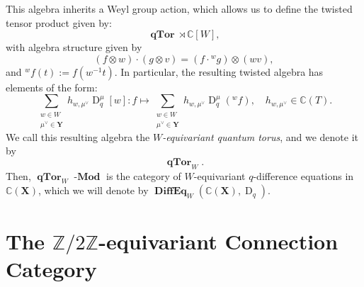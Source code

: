 \documentclass[a4paper]{report}
\theoremstyle{theorem}
\theoremstyle{definition}
\theoremstyle{remark}
\theoremstyle{proposition}
\theoremstyle{conjecture}
\theoremstyle{lemma}
\theoremstyle{corollary}
\theoremstyle{exercise}
\theoremstyle{example}
\newcommand{\C}{\mathbb{C}}
\newcommand{\on}{\operatorname}
\newcommand{\lmod}{\on{\mathbf{-Mod}}}
\newcommand{\qTor}{\on{\mathbf{qTor}}}
\newcommand{\DiffEq}{\on{\mathbf{DiffEq}}}
\begin{document}
  This algebra inherits a 
  Weyl group action, which allows us to define the twisted tensor product given 
  by:
  $$\qTor \rtimes \C[W],$$
  with algebra structure given by 
  $$(f\otimes w)\cdot (g\otimes v) = (f \cdot {}^wg) \otimes (wv),$$
  and ${}^wf(t) := f(w^{-1}t)$. 
  In particular, the resulting twisted algebra has elements of the form:
  $$\sum_{\substack{w \in W\\ \mu^\vee \in \mathbf{Y}}} h_{w,\mu^\vee} \on{D}^\mu_q[w] : f \longmapsto \sum_{\substack{w\in W\\ \mu^\vee \in \mathbf{Y}}} h_{w,\mu^\vee} \on{D}^\mu_q({}^wf), \quad h_{w,\mu^\vee}\in \C(T).$$
  We call this resulting algebra the \emph{$W$-equivariant quantum torus},
  and we denote it by 
  $$\qTor_W.$$ 
  Then, $\qTor_W\lmod$ is the category of $W$-equivariant $q$-difference equations
  in $\C(\mathbf{X})$, which we will denote by 
  $\DiffEq_W(\C(\mathbf{X}),\on{D}_q)$.
  
  \section{The $\mathbb{Z}/2\mathbb{Z}$-equivariant Connection Category}
  
\end{document}

